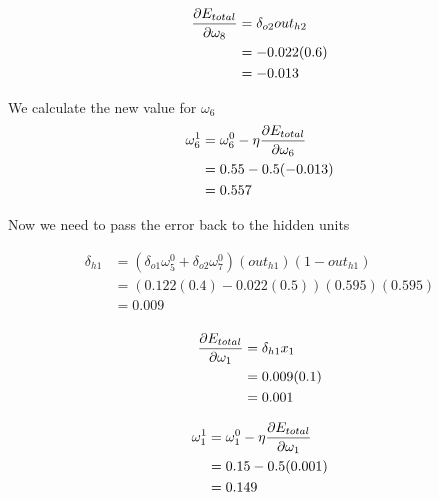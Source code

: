 \documentclass[10pt,a4paper]{article}
\begin{document}
\begin{equation}
\begin{split}
\pdv{E_{total}}{\omega_8} &= \delta_{o2}out_{h2}\\
                          &= -0.022(0.6)\\
                          &= -0.013\\
\end{split}
\end{equation}

We calculate the new value for $\omega_6$
\begin{equation}
\begin{split}
\omega_6^1 &= \omega_6^0 - \eta\pdv{E_{total}}{\omega_6}\\
           &= 0.55 -0.5(-0.013)\\
           &= 0.557\\
\end{split}
\end{equation}







Now we need to pass the error back to the hidden units

\begin{equation}
\begin{split}
\delta_{h1} &= (\delta_{o1}\omega_5^0 + \delta_{o2}\omega_7^0)(out_{h1})(1-out_{h1})\\
&= (0.122(0.4) -0.022(0.5))(0.595)(0.595)\\
&= 0.009\\
\end{split}
\end{equation}

\begin{equation}
\begin{split}
\pdv{E_{total}}{\omega_1} &= \delta_{h1}x_1\\ 
                          &= 0.009(0.1)\\
                          &= 0.001\\
\end{split}
\end{equation}

\begin{equation}
\begin{split}
\omega_1^1 &= \omega_1^0 - \eta\pdv{E_{total}}{\omega_1}\\
           &= 0.15 -0.5(0.001)\\
           &= 0.149\\
\end{split}
\end{equation}
\end{document}
